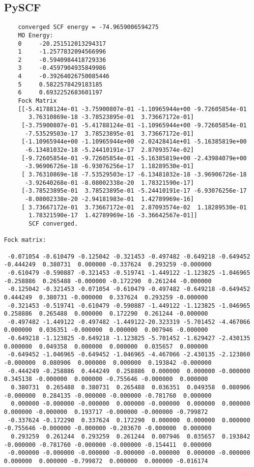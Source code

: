 \documentclass[12pt,a4paper,openany,twoside]{article}
\numberwithin{equation}{section}
\begin{document}
\subsection{PySCF}
\begin{lstlisting}
    converged SCF energy = -74.9659006594275
    MO Energy:
    0     -20.251512013294317
    1     -1.2577832094566996
    2     -0.5940984418729336
    3     -0.4597904935849986
    4     -0.39264026750085446
    5     0.5822578429183185
    6     0.6932252683601197
    Fock Matrix
    [[-5.41788124e-01 -3.75900807e-01 -1.10965944e+00 -9.72605854e-01
       3.76310869e-18 -3.78523895e-01  3.73667172e-01]
     [-3.75900807e-01 -5.41788124e-01 -1.10965944e+00 -9.72605854e-01
      -7.53529503e-17  3.78523895e-01  3.73667172e-01]
     [-1.10965944e+00 -1.10965944e+00 -2.02428414e+01 -5.16385819e+00
      -6.13481032e-18 -5.24410191e-17  2.87093574e-02]
     [-9.72605854e-01 -9.72605854e-01 -5.16385819e+00 -2.43984079e+00
      -3.96906726e-18 -6.93076256e-17  1.18289530e-01]
     [ 3.76310869e-18 -7.53529503e-17 -6.13481032e-18 -3.96906726e-18
      -3.92640268e-01 -8.08002338e-20  1.78321590e-17]
     [-3.78523895e-01  3.78523895e-01 -5.24410191e-17 -6.93076256e-17
      -8.08002338e-20 -2.94181983e-01  1.42789969e-16]
     [ 3.73667172e-01  3.73667172e-01  2.87093574e-02  1.18289530e-01
       1.78321590e-17  1.42789969e-16 -3.36642567e-01]]
       SCF converged.

Fock matrix:

 -0.071054 -0.610479 -0.125042 -0.321453 -0.497482 -0.649218 -0.649452 -0.444249  0.380731  0.000000 -0.337624  0.293259 -0.000000
 -0.610479 -0.590887 -0.321453 -0.519741 -1.449122 -1.123825 -1.046965 -0.258886  0.265488 -0.000000 -0.172290  0.261244 -0.000000
 -0.125042 -0.321453 -0.071054 -0.610479 -0.497482 -0.649218 -0.649452  0.444249  0.380731 -0.000000  0.337624  0.293259 -0.000000
 -0.321453 -0.519741 -0.610479 -0.590887 -1.449122 -1.123825 -1.046965  0.258886  0.265488  0.000000  0.172290  0.261244 -0.000000
 -0.497482 -1.449122 -0.497482 -1.449122-20.323319 -5.701452 -4.467066  0.000000  0.036351 -0.000000  0.000000  0.007946 -0.000000
 -0.649218 -1.123825 -0.649218 -1.123825 -5.701452 -1.629427 -2.430135  0.000000  0.049358  0.000000  0.000000  0.035657  0.000000
 -0.649452 -1.046965 -0.649452 -1.046965 -4.467066 -2.430135 -2.123860 -0.000000  0.080906  0.000000  0.000000  0.193842 -0.000000
 -0.444249 -0.258886  0.444249  0.258886  0.000000  0.000000 -0.000000  0.345138 -0.000000  0.000000 -0.755646 -0.000000  0.000000
  0.380731  0.265488  0.380731  0.265488  0.036351  0.049358  0.080906 -0.000000  0.284135 -0.000000 -0.000000 -0.781760  0.000000
  0.000000 -0.000000 -0.000000  0.000000 -0.000000  0.000000  0.000000  0.000000 -0.000000  0.193717 -0.000000 -0.000000 -0.799872
 -0.337624 -0.172290  0.337624  0.172290  0.000000  0.000000  0.000000 -0.755646 -0.000000 -0.000000 -0.203670 -0.000000  0.000000
  0.293259  0.261244  0.293259  0.261244  0.007946  0.035657  0.193842 -0.000000 -0.781760 -0.000000 -0.000000 -0.154411  0.000000
 -0.000000 -0.000000 -0.000000 -0.000000 -0.000000  0.000000 -0.000000  0.000000  0.000000 -0.799872  0.000000  0.000000 -0.016174




\end{lstlisting}
\end{document}
